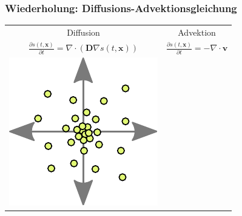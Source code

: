 \documentclass[aspectratio=32]{beamer}
\begin{document}
\begin{frame}
\frametitle{Wiederholung: Diffusions-Advektionsgleichung}

\begin{center}
\begin{tabular}{ c c }
	Diffusion & Advektion \\
	\(
		\frac{\partial s(t,\bm{x})}{\partial t} = \nabla \cdot \left( \bm{D} \nabla s(t,\bm{x}) \right)
	\)
	&
	\(
		\frac{\partial s(t,\bm{x})}{\partial t} = - \nabla \cdot \bm{v}
	\)
	\\
  \includegraphics[width=\textwidth/3,keepaspectratio]{Bilder/diffusion.pdf}
	&

\end{tabular}
\end{center}
\end{frame}
\end{document}
